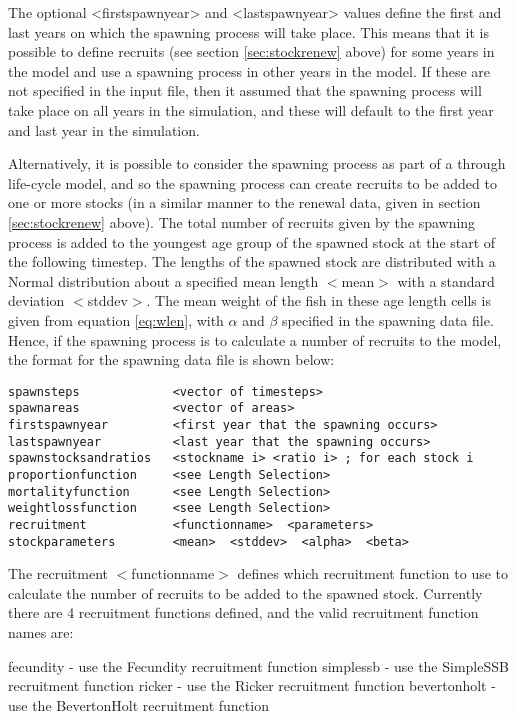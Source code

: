 \documentclass[]{book}
\begin{document}
The optional \textless{}firstspawnyear\textgreater{} and \textless{}lastspawnyear\textgreater{} values define the
first and last years on which the spawning process will take place. This
means that it is possible to define recruits (see
section \ref{sec:stockrenew} above) for some years in the model and use a
spawning process in other years in the model. If these are not specified
in the input file, then it assumed that the spawning process will take
place on all years in the simulation, and these will default to the
first year and last year in the simulation.

Alternatively, it is possible to consider the spawning process as part
of a through life-cycle model, and so the spawning process can create
recruits to be added to one or more stocks (in a similar manner to the
renewal data, given in
section \ref{sec:stockrenew} above). The total number of recruits given
by the spawning process is added to the youngest age group of the
spawned stock at the start of the following timestep. The lengths of the
spawned stock are distributed with a Normal distribution about a
specified mean length \(<\)mean\(>\) with a standard deviation \(<\)stddev\(>\).
The mean weight of the fish in these age length cells is given from
equation \eqref{eq:wlen}, with \(\alpha\) and \(\beta\) specified in the
spawning data file. Hence, if the spawning process is to calculate a
number of recruits to the model, the format for the spawning data file
is shown below:

\begin{verbatim}
spawnsteps             <vector of timesteps>
spawnareas             <vector of areas>
firstspawnyear         <first year that the spawning occurs>
lastspawnyear          <last year that the spawning occurs>
spawnstocksandratios   <stockname i> <ratio i> ; for each stock i
proportionfunction     <see Length Selection>
mortalityfunction      <see Length Selection>
weightlossfunction     <see Length Selection>
recruitment            <functionname>  <parameters>
stockparameters        <mean>  <stddev>  <alpha>  <beta>
\end{verbatim}

The recruitment \(<\)functionname\(>\) defines which recruitment function to
use to calculate the number of recruits to be added to the spawned
stock. Currently there are 4 recruitment functions defined, and the
valid recruitment function names are:

fecundity - use the Fecundity recruitment function simplessb - use the
SimpleSSB recruitment function ricker - use the Ricker recruitment
function bevertonholt - use the BevertonHolt recruitment function
\end{document}
